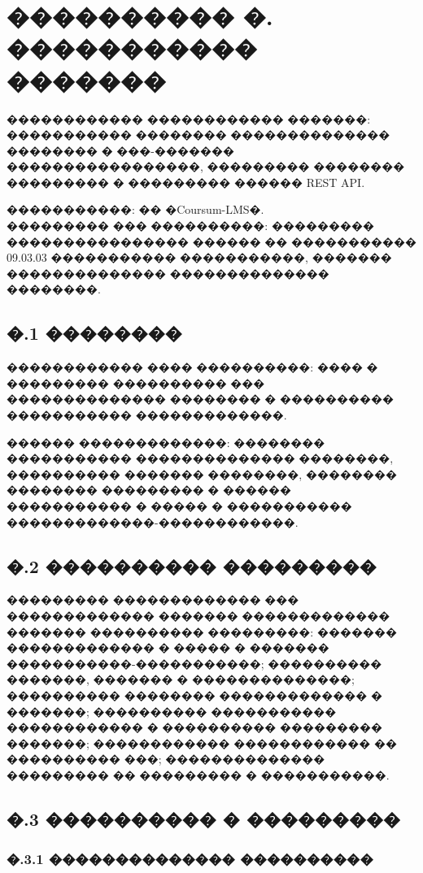 \chapter{{\fontsize{14pt}{21pt}\selectfont\MakeUppercase{���������� �. ����������� �������}}}
\label{app:tz}

\noindent{}������������ ������������ �������: ����������� �������� �������������� �������� � ���-������� �����������������, ��������� �������� ��������� � ��������� ������ REST API.

\noindent{}�����������: �� �Coursum-LMS�.\\
\noindent{}��������� ��� ����������: ��������� ���������������� ������ �� ����������� 09.03.03 ����������� �����������, ������� �������������� �������������� ��������.

\section*{�.1 ��������}

������������ ���� ����������: ���� � ��������� ���������� ��� �������������� �������� � ���������� ����������� �������������.

������ �������������: �������� ����������� �������������� ��������, ���������� ������� ��������, �������� �������� ��������� � ������ ����������� � ����� � ����������� �������������-������������\cite{gost1920178,gost1930179,gost3460190}.

\section*{�.2 ���������� ���������}

��������� ������������� ��� ������������� ������� ������������� ������� ���������� ���������: ������� ������������� � ����� � ������� �����������-�����������; ���������� �������, ������� � ��������������; ���������� �������� ������������� � �������; ���������� ����������� ������������ � ���������� ��������� �������; ������������ ������������ �� ���������� ���; �������������� ��������� �� ��������� � �����������.

\section*{�.3 ���������� � ���������}

\subsection*{�.3.1 �������������� ����������}

